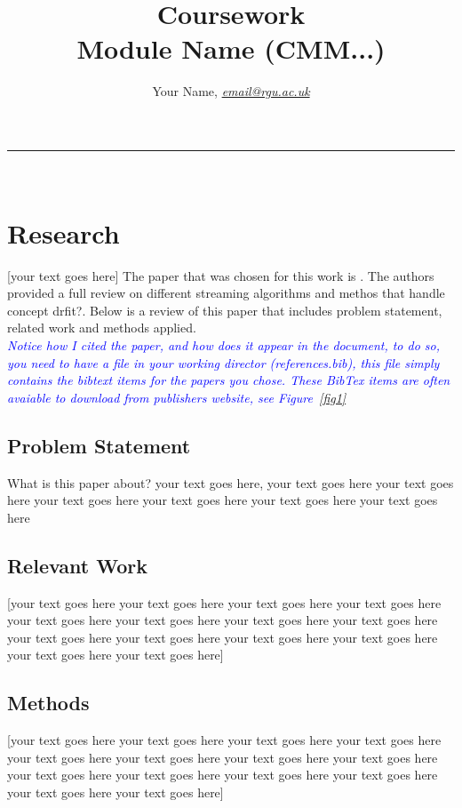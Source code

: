 \documentclass[10pt]{article}
\begin{document}



\title{\LARGE Coursework  \\ Module Name (CMM...)}

\author{Your Name, \textit{\href{email@rgu.ac.uk}{email@rgu.ac.uk}}}
\maketitle
\noindent\rule{16cm}{0.4pt}
\ \\

\section{Research}

[your text goes here]
The paper that was chosen for this work is \cite{6779381}. The authors provided a full review on different streaming algorithms and methos that handle concept drfit?. Below is a review of this paper that includes problem statement, related work and methods applied.\\

\textcolor{blue}{\textit{Notice how I cited the paper, and how does it appear in the document, to do so, you need to have a file in your working director (references.bib), this file simply contains the bibtext items for the papers you chose. These BibTex items are often avaiable to download from publishers website, see Figure~\ref{fig1}}}
\subsection{Problem Statement}
What is this paper about? your text goes here, your text goes here your text goes here your text goes here your text goes here your text goes here your text goes here

\subsection{Relevant Work}
[your text goes here your text goes here your text goes here your text goes here your text goes here your text goes here your text goes here your text goes here your text goes here your text goes here your text goes here your text goes here your text goes here your text goes here]
\subsection{Methods}
[your text goes here your text goes here your text goes here your text goes here your text goes here your text goes here your text goes here your text goes here your text goes here your text goes here your text goes here your text goes here your text goes here your text goes here]
\end{document}
